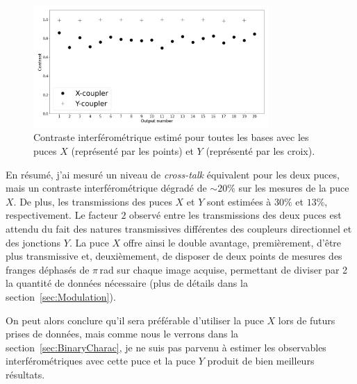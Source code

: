 \begin{figure}[ht!]
    \centering
    \includegraphics[width=0.8\textwidth]{Figure_Chap2/ContrastComparison_20201124_20201119_LaTex.png}
    \caption[Contraste interférométrique estimé pour toutes les bases avec les puces $X$ et $Y$.]{Contraste interférométrique estimé pour toutes les bases avec les puces $X$ (représenté par les points) et $Y$ (représenté par les croix).}
    \label{fig:ChipContrast}
\end{figure}



En résumé, j'ai mesuré un niveau de \textit{cross-talk} équivalent pour les deux puces, mais un contraste interférométrique dégradé de $\sim 20\%$ sur les mesures de la puce $X$. De plus, les transmissions des puces $X$ et $Y$ sont estimées à $30\%$ et $13\%$, respectivement. Le facteur $2$ observé entre les transmissions des deux puces est attendu du fait des natures transmissives différentes des coupleurs directionnel et des jonctions $Y$. La puce $X$ offre ainsi le double avantage, premièrement, d'être plus transmissive et, deuxièmement, de disposer de deux points de mesures des franges déphasés de $\pi \,$rad sur chaque image acquise, permettant de diviser par 2 la quantité de données nécessaire (plus de détails dans la section~\ref{sec:Modulation}).

On peut alors conclure qu'il sera préférable d'utiliser la puce $X$ lors de futurs prises de données, mais comme nous le verrons dans la section~\ref{sec:BinaryCharac}, je ne suis pas parvenu à estimer les observables interférométriques avec cette puce et la puce $Y$ produit de bien meilleurs résultats.

